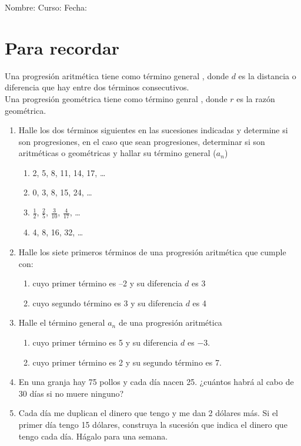 \documentclass[fleqn]{article}
\newcommand{\LineaNombre}{%
\par
\vspace{\baselineskip}
Nombre:\hrulefill \; Curso: \underline{\hspace*{48pt}} \; Fecha: \underline{\hspace*{2.5cm}} \relax
\par}
\begin{document}
\LineaNombre
\section*{Para recordar}
Una progresi\'on aritmética tiene como término general , donde $d$ es la distancia o diferencia que hay entre dos términos consecutivos.\\

Una progresión geométrica tiene como término genral ,
donde $r$ es la razón geométrica.
\begin{enumerate}
\item Halle los dos términos siguientes en las sucesiones indicadas y determine si son progresiones, en el caso que sean progresiones, determinar si son aritméticas o geométricas y hallar su término general ($a_{n}$)
\begin{enumerate}
\item 2, 5, 8, 11, 14, 17, \ldots \noanswer
\item 0, 3, 8, 15, 24, \ldots \noanswer
\item $\frac{1}{2}$, $\frac{2}{5}$, $\frac{3}{10}$, $\frac{4}{17}$, \ldots \noanswer
\item 4, 8, 16, 32, \ldots \noanswer
\end{enumerate}
\item Halle los siete primeros términos de una progresión aritmética que cumple con:
\begin{enumerate}
\item cuyo primer término es --2 y su diferencia $d$ es 3 \noanswer
\item cuyo segundo término es 3 y su diferencia $d$ es 4 \noanswer
\end{enumerate}
\item Halle el término general $a_{n}$ de una progresión aritmética
\begin{enumerate}
\item cuyo primer término es 5 y su diferencia $d$ es $-3$.\vspace*{40pt}
\item cuyo primer término es 2 y su segundo término es 7.\vspace*{40pt}
\end{enumerate}
\item En una granja hay 75 pollos y cada día nacen 25. ¿cuántos habrá al cabo de 30 días si no muere ninguno?\vspace*{50pt}
\item Cada día me duplican el dinero que tengo y me dan 2 dólares más. Si el primer día tengo 15 dólares, construya la sucesión que indica el dinero que tengo cada día. Hágalo para una semana.
\end{enumerate}
\end{document}
